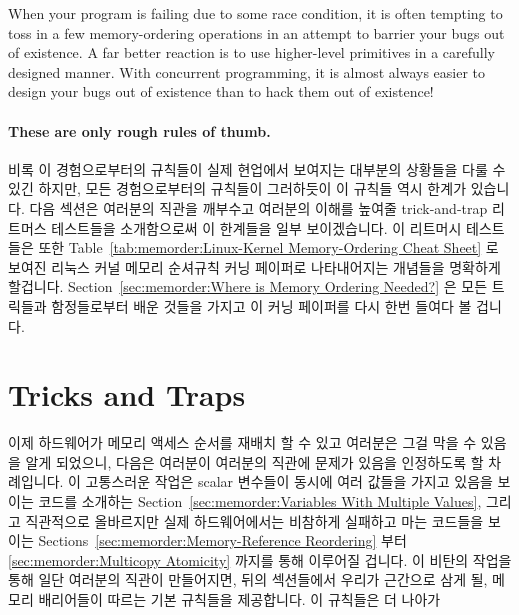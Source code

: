 When your program is failing due to some race condition, it is often
tempting to toss in a few memory-ordering operations in an attempt
to barrier your bugs out of existence.
A far better reaction is to use higher-level primitives in a carefully
designed manner.
With concurrent programming, it is almost always easier to design
your bugs out of existence than to hack them out of existence!
\fi

\paragraph{These are only rough rules of thumb.}
비록 이 경험으로부터의 규칙들이 실제 현업에서 보여지는 대부분의 상황들을 다룰
수 있긴 하지만, 모든 경험으로부터의 규칙들이 그러하듯이 이 규칙들 역시 한계가
있습니다.
다음 섹션은 여러분의 직관을 깨부수고 여러분의 이해를 높여줄 trick-and-trap
리트머스 테스트들을 소개함으로써 이 한계들을 일부 보이겠습니다.
이 리트머시 테스트들은 또한
Table~\ref{tab:memorder:Linux-Kernel Memory-Ordering Cheat Sheet}
로 보여진 리눅스 커널 메모리 순셔규칙 커닝 페이퍼로 나타내어지는 개념들을
명확하게 할겁니다.
Section~\ref{sec:memorder:Where is Memory Ordering Needed?} 은 모든 트릭들과
함정들로부터 배운 것들을 가지고 이 커닝 페이퍼를 다시 한번 들여다 볼 겁니다.

\section{Tricks and Traps}
\label{sec:memorder:Tricks and Traps}

이제 하드웨어가 메모리 액세스 순서를 재배치 할 수 있고 여러분은 그걸 막을 수
있음을 알게 되었으니, 다음은 여러분이 여러분의 직관에 문제가 있음을 인정하도록
할 차례입니다.
이 고통스러운 작업은 scalar 변수들이 동시에 여러 값들을 가지고 있음을 보이는
코드를 소개하는
Section~\ref{sec:memorder:Variables With Multiple Values}, 그리고
직관적으로 올바르지만 실제 하드웨어에서는 비참하게 실패하고 마는 코드들을
보이는
Sections~\ref{sec:memorder:Memory-Reference Reordering} 부터
\ref{sec:memorder:Multicopy Atomicity} 까지를 통해 이루어질 겁니다.
이 비탄의 작업을 통해 일단 여러분의 직관이 만들어지면, 뒤의 섹션들에서 우리가
근간으로 삼게 될, 메모리 배리어들이 따르는 기본 규칙들을 제공합니다.
이 규칙들은 더 나아가

